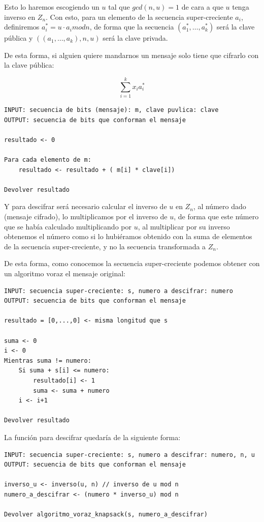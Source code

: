 \documentclass[12pt, spanish]{article}
\begin{document}
Esto lo haremos escogiendo un $u$ tal que $gcd(n,u) = 1$ de cara a que $u$ tenga inverso en $Z_n$. Con esto, para un elemento de la secuencia super-creciente $a_i$, definiremos $a_i^* = u \cdot a_i mod n$, de forma que la secuencia $(a_1^*, \dots, a_k^*)$ será la clave pública y $((a_1, \dots, a_k),n, u)$ será la clave privada.

De esta forma, si alguien quiere mandarnos un mensaje solo tiene que cifrarlo con la clave pública:

$$
\sum_{i = 1}^{k} x_i a_i^*
$$


\begin{lstlisting}[caption={Algoritmo para descifrar un mensaje}]
INPUT: secuencia de bits (mensaje): m, clave puvlica: clave
OUTPUT: secuencia de bits que conforman el mensaje

resultado <- 0

Para cada elemento de m:
	resultado <- resultado + ( m[i] * clave[i])

Devolver resultado
\end{lstlisting}


Y para descifrar será necesario calcular el inverso de $u$ en $Z_n$, al número dado (mensaje cifrado), lo multiplicamos por el inverso de $u$, de forma que este número que se había calculado multiplicando por $u$, al multiplicar por su inverso obtenemos el número como si lo hubiéramos obtenido con la suma de elementos de la secuencia super-creciente, y no la secuencia transformada a $Z_n$.

De esta forma, como conocemos la secuencia super-creciente podemos obtener con un algoritmo voraz el mensaje original:

\begin{lstlisting}[caption={Algoritmo voraz para la función knapsack}]
INPUT: secuencia super-creciente: s, numero a descifrar: numero
OUTPUT: secuencia de bits que conforman el mensaje

resultado = [0,...,0] <- misma longitud que s

suma <- 0
i <- 0
Mientras suma != numero:
	Si suma + s[i] <= numero:
		resultado[i] <- 1
		suma <- suma + numero
	i <- i+1

Devolver resultado
\end{lstlisting}

La función para descifrar quedaría de la siguiente forma:

\begin{lstlisting}[caption={Algoritmo para descifrar un mensaje}]
INPUT: secuencia super-creciente: s, numero a descifrar: numero, n, u
OUTPUT: secuencia de bits que conforman el mensaje

inverso_u <- inverso(u, n) // inverso de u mod n
numero_a_descifrar <- (numero * inverso_u) mod n

Devolver algoritmo_voraz_knapsack(s, numero_a_descifrar)
\end{lstlisting}
\end{document}

